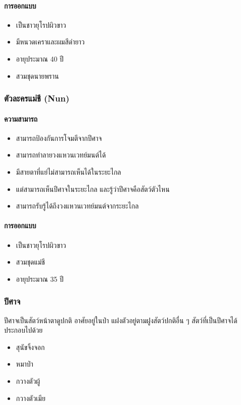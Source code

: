 \paragraph{การออกแบบ}
\begin{itemize}
  \item เป็นชาวยุโรปผิวขาว
  \item มีหนวดเคราและผมสีดำยาว
  \item อายุประมาณ 40 ปี
  \item สวมชุดนายพราน
\end{itemize}

\subsubsection{ตัวละครแม่ชี (Nun)}

\paragraph{ความสามารถ}
\begin{itemize}
  \item สามารถป้องกันการโจมตีจากปีศาจ
  \item สามารถทำลายวงแหวนเวทย์มนต์ได้
  \item มีสายตาที่แย่ไม่สามารถเห็นได้ในระยะไกล
  \item แต่สามารถเห็นปีศาจในระยะไกล และรู้ว่าปีศาจคือสัตว์ตัวไหน
  \item สามารถรับรู้ได้ถึงวงแหวนเวทย์มนต์จากระยะไกล
\end{itemize}

\paragraph{การออกแบบ}
\begin{itemize}
  \item เป็นชาวยุโรปผิวขาว
  \item สวมชุดแม่ชี
  \item อายุประมาณ 35 ปี
\end{itemize}

\subsubsection{ปีศาจ}

ปีศาจเป็นสัตว์หน้าตาดูปกติ อาศัยอยู่ในป่า แฝงตัวอยู่ตามฝูงสัตว์ปกติอื่น ๆ สัตว์ที่เป็นปีศาจได้ ประกอบไปด้วย
\begin{itemize}
  \item สุนัขจิ้งจอก
  \item หมาป่า
  \item กวางตัวผู้
  \item กวางตัวเมีย
\end{itemize}


